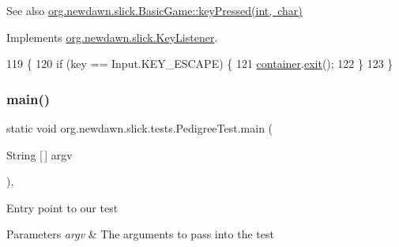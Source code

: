 \begin{DoxySeeAlso}{See also}
\mbox{\hyperlink{classorg_1_1newdawn_1_1slick_1_1_basic_game_a4fbb3345b5abf5ddd54a99466d07f02f}{org.\+newdawn.\+slick.\+Basic\+Game\+::key\+Pressed(int, char)}} 
\end{DoxySeeAlso}


Implements \mbox{\hyperlink{interfaceorg_1_1newdawn_1_1slick_1_1_key_listener_ac0b0568a21ef486c4f51382614c196ef}{org.\+newdawn.\+slick.\+Key\+Listener}}.


\begin{DoxyCode}
119                                             \{
120         \textcolor{keywordflow}{if} (key == Input.KEY\_ESCAPE) \{
121             \mbox{\hyperlink{classorg_1_1newdawn_1_1slick_1_1tests_1_1_pedigree_test_a803d53a8e6fe77152a4710313def6132}{container}}.\mbox{\hyperlink{classorg_1_1newdawn_1_1slick_1_1_game_container_a6d888463695fe3aac4123e72ac14480f}{exit}}();
122         \}
123     \}
\end{DoxyCode}
\mbox{\label{classorg_1_1newdawn_1_1slick_1_1tests_1_1_pedigree_test_ab301563be4da71da7b579ea5e82eeaeb}} 
\subsubsection{\texorpdfstring{main()}{main()}}
{\footnotesize\ttfamily static void org.\+newdawn.\+slick.\+tests.\+Pedigree\+Test.\+main (\begin{DoxyParamCaption}\item[{String \mbox{[}$\,$\mbox{]}}]{argv }\end{DoxyParamCaption})\hspace{0.3cm}{\ttfamily [inline]}, {\ttfamily [static]}}

Entry point to our test


\begin{DoxyParams}{Parameters}
{\em argv} & The arguments to pass into the test \\
\hline
\end{DoxyParams}

